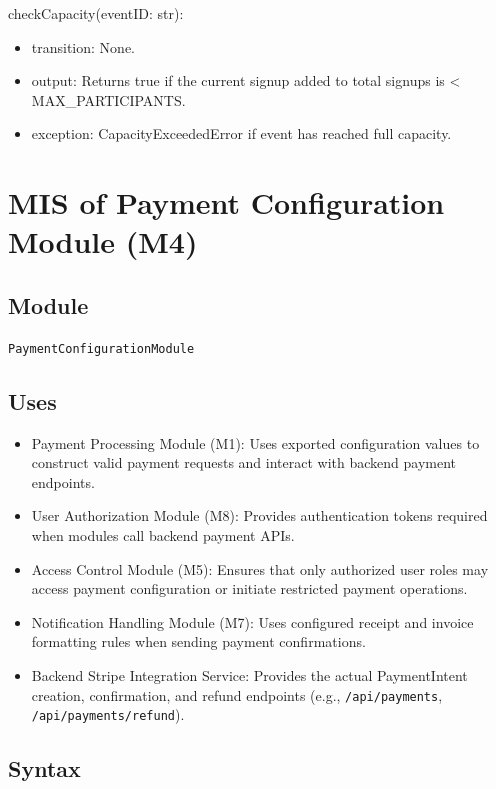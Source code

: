 \documentclass[12pt, titlepage]{article}
\begin{document}
\noindent checkCapacity(eventID: str):
\begin{itemize}
\item transition: None.
\item output: Returns true if the current signup added to total signups is < MAX\_PARTICIPANTS.
\item exception: CapacityExceededError if event has reached full capacity.
\end{itemize}

\section{MIS of Payment Configuration Module (M4)}

\subsection{Module}

\texttt{PaymentConfigurationModule}\\

\subsection{Uses}

\begin{itemize}
    \item Payment Processing Module (M1): Uses exported configuration values
    to construct valid payment requests and interact with backend payment endpoints.
    \item User Authorization Module (M8): Provides authentication tokens required
    when modules call backend payment APIs.
    \item Access Control Module (M5): Ensures that only authorized user roles may
    access payment configuration or initiate restricted payment operations.
    \item Notification Handling Module (M7): Uses configured receipt and invoice
    formatting rules when sending payment confirmations.
    \item Backend Stripe Integration Service: Provides the actual
    PaymentIntent creation, confirmation, and refund endpoints (e.g., 
    \texttt{/api/payments}, \texttt{/api/payments/refund}).
\end{itemize}

\subsection{Syntax}
\end{document}
